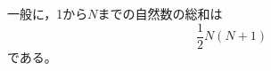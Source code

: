 \documentclass{article}
\begin{document}
一般に，1から$N$までの自然数の総和は
\begin{equation}
    \frac{1}{2} N (N + 1)
\end{equation}
である。
\end{document}
